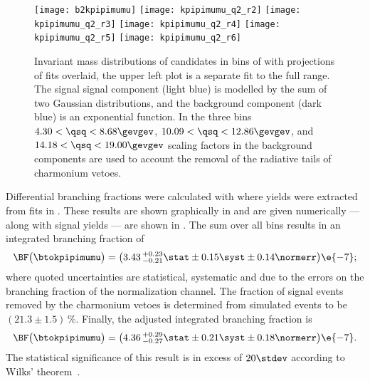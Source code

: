 \begin{figure}
  \begin{center}
    \texttt{[image: b2kpipimumu]}
    \texttt{[image: kpipimumu\_q2\_r2]}
    \texttt{[image: kpipimumu\_q2\_r3]}
    \texttt{[image: kpipimumu\_q2\_r4]}
    \texttt{[image: kpipimumu\_q2\_r5]}
    \texttt{[image: kpipimumu\_q2\_r6]}
    \caption[Fits to signal decay \btokpipimumu]
    {\small
      Invariant mass distributions of \btokpipimumu candidates in bins of \qsq with projections of
      fits overlaid, the upper left plot is a separate fit to the full \qsq range.
      The signal signal component (light blue) is modelled by the sum of two Gaussian
      distributions, and the background component (dark blue) is an exponential function.
      In the three \qsq bins $4.30<\qsq<8.68\gevgev$, $10.09<\qsq<12.86\gevgev$, and
      $14.18<\qsq<19.00\gevgev$ scaling factors in the background components are used to account
      the removal of the radiative tails of charmonium vetoes.
    }
    \label{fig:kpipi:q2fits}
  \end{center}
\end{figure}

Differential branching fractions were calculated with  where yields were
extracted from fits in .
These results are shown graphically in  and are given numerically --- along
with signal yields --- are shown in .
The sum over all \qsq bins results in an integrated branching fraction of
\begin{equation*}
  \BF\big( \btokpipimumu \big)=
  \big(3.43\,^{+0.23}_{-0.21}\stat\pm0.15\syst\pm0.14\normerr\big)\e{-7};
\end{equation*}
where quoted uncertainties are statistical, systematic and due to the errors on the branching
fraction of the normalization channel.
The fraction of signal events removed by the charmonium vetoes is determined from simulated
 events %
to be $(21.3\pm1.5)\,\%$.
Finally, the adjusted integrated branching fraction is
\begin{equation*}
  \BF\big( \btokpipimumu \big)=
  \big(4.36\,^{+0.29}_{-0.27}\stat\pm0.21\syst\pm0.18\normerr\big)\e{-7}.
\end{equation*}
The statistical significance of this result is in excess of $20\stdev$ according to Wilks'
theorem~\cite{wilks1938}.

